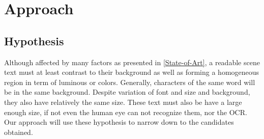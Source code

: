   
\graphicspath{ {4chapterOurApproach/image/} }
\chapter{Approach} \label{Approach}
\section{Hypothesis}
\par
Although affected by many factors as presented in \autoref{State-of-Art}, a readable scene text must at least contrast to their background as well as forming a homogeneous region in term of luminous or colors. Generally, characters of the same word will be in the same background. Despite variation of font and size and background, they also have relatively the same size. These text must also be have a large enough size, if not even the human eye can not recognize them, nor the OCR. Our approach will use these hypothesis to narrow down to the candidates obtained.
